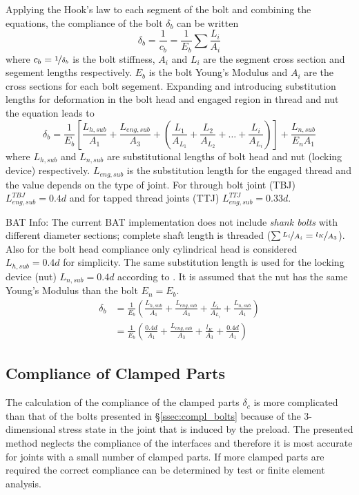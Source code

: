 Applying the Hook's law to each segment of the bolt and combining the equations, the compliance of the 
bolt $\delta_b$ can be written
\begin{equation}
  \delta_b = \frac{1}{c_b}=\frac{1}{E_b}\sum\frac{L_i}{A_i}
  \label{equ:delta_b_1}
\end{equation}
where $c_b=\nicefrac{1}{\delta_b}$ is the bolt stiffness, $A_i$ and $L_i$ are the segment cross section 
and segement lengths respectively. $E_b$ is the bolt Young's Modulus and 
$A_i$ are the cross sections for each bolt segement. Expanding  and introducing 
substitution lengths for deformation in the bolt head and engaged region in thread and nut the equation
leads to
\begin{equation}
  \delta_b = \frac{1}{E_b}\left[\frac{L_{h,sub}}{A_1}+\frac{L_{eng,sub}}{A_3}+\left(
    \frac{L_1}{A_{L_1}}+\frac{L_2}{A_{L_2}}+\dots+\frac{L_i}{A_{L_i}}\right)\right]
    +\frac{L_{n,sub}}{E_n A_1}
\end{equation}
where $L_{h,sub}$ and $L_{n,sub}$ are substitutional lengths of bolt head and nut (locking device) 
respectively. $L_{eng,sub}$ is the substitution length for the engaged thread and the value depends 
on the type of joint. For through bolt joint (TBJ) $L_{eng,sub}^{TBJ}=0.4d$ and for tapped thread 
joints (TTJ) $L_{eng,sub}^{TTJ}=0.33d$.
\begin{colbox}{BAT Info:}
  The current BAT implementation does not include \emph{shank bolts} with different diameter sections; 
  complete shaft length is threaded ($\sum \nicefrac{L_i}{A_i} = \nicefrac{l_K}{A_3}$). Also for the bolt head compliance only cylindrical
  head is considered $L_{h,sub}=0.4d$ for simplicity. The same substitution length is used for the
  locking device (nut) $L_{n,sub}=0.4d$ according to \cite{ECSS_HB_32_23A}. It is assumed that the nut
  has the same Young's Modulus than the bolt $E_n=E_b$. 
  \begin{subequations}
    \begin{align}
      \delta_b &= \frac{1}{E_b}\left(\frac{L_{h,sub}}{A_1}+\frac{L_{eng,sub}}{A_3}
        +\frac{L_i}{A_{L_i}}+\frac{L_{n,sub}}{A_1}\right) \\
        &= \frac{1}{E_b}\left(\frac{0.4d}{A_1}+\frac{L_{eng,sub}}{A_3}
        +\frac{l_K}{A_3}+\frac{0.4d}{A_1}\right)
    \end{align}
  \end{subequations}
\end{colbox}

\subsection{Compliance of Clamped Parts}
\label{ssec:compl_cp}
The calculation of the compliance of the clamped parts $\delta_c$ is more complicated than that of the 
bolts presented in §\ref{ssec:compl_bolts} because of the 3-dimensional stress state in the joint that 
is induced by the preload. The presented method \cite{ECSS_HB_32_23A} neglects the compliance of the 
interfaces and therefore it is most accurate for joints with a small number of clamped parts. If more
clamped parts are required the correct compliance can be determined by test or finite element analysis.

